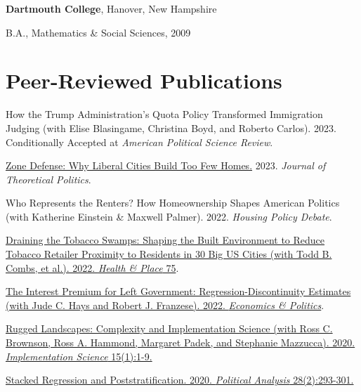 \documentclass[margin,line]{res}
\newenvironment{list1}{
  \begin{list}{}{%
      \setlength{\itemsep}{0.1in}
      \setlength{\parsep}{0in} \setlength{\parskip}{0in}
      \setlength{\topsep}{0.1in} \setlength{\partopsep}{0in} 
      \setlength{\leftmargin}{0.17in}}}{\end{list}}
\newenvironment{publist}{
	\begin{list}{}{%
			\setlength{\itemsep}{0.15in}
			\setlength{\parsep}{0in} \setlength{\parskip}{0in}
			\setlength{\topsep}{0in} \setlength{\partopsep}{0in} 
			\setlength{\leftmargin}{0.15in}
			\setlength{\itemindent}{-0.15in}}}
		{\end{list}}
\begin{document}
\begin{resume}
{\bf Dartmouth College}, Hanover, New Hampshire
\begin{list1}
\item[] B.A., Mathematics \& Social Sciences, 2009
\end{list1}




\section{\sc Peer-Reviewed Publications}

\begin{publist}
	
	\item How the Trump Administration’s Quota Policy Transformed Immigration Judging (with Elise Blasingame, Christina Boyd, and Roberto Carlos). 2023. Conditionally Accepted at \textit{American Political Science Review}.	
	
	\item \href{https://joeornstein.github.io/publications/ornstein-zone-defense.pdf}{Zone Defense: Why Liberal Cities Build Too Few Homes.} 2023. \textit{Journal of Theoretical Politics}.
	
	\item Who Represents the Renters? How Homeownership Shapes American Politics (with Katherine Einstein \& Maxwell Palmer). 2022. \textit{Housing Policy Debate}. 
	
	\item \href{https://www.sciencedirect.com/science/article/pii/S1353829222000764}{Draining the Tobacco Swamps: Shaping the Built Environment to Reduce Tobacco Retailer Proximity to Residents in 30 Big US Cities (with Todd B. Combs, et al.). 2022. \textit{Health \& Place} 75}.
	
	\item \href{https://onlinelibrary.wiley.com/doi/abs/10.1111/ecpo.12204}{The Interest Premium for Left Government: Regression-Discontinuity Estimates (with Jude C. Hays and Robert J. Franzese). 2022. \textit{Economics \& Politics}}.
			
	\item \href{https://link.springer.com/article/10.1186/s13012-020-01028-5}{Rugged Landscapes: Complexity and Implementation Science (with Ross C. Brownson, Ross A. Hammond, Margaret Padek, and Stephanie Mazzucca). 2020. \textit{Implementation Science} 15(1):1-9.}
	
	\item \href{https://doi.org/10.1017/pan.2019.43}{Stacked Regression and Poststratification. 2020. \textit{Political Analysis} 28(2):293-301.}
	

\end{publist}
\end{resume}
\end{document}
